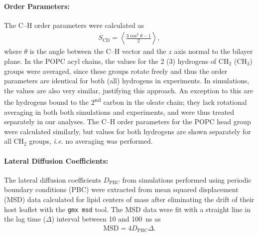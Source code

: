 \documentclass[journal=jctcce]{achemso}
\begin{document}
\paragraph{Order Parameters:} The C--H order parameters were calculated as
%
\begin{align}
    S_\mathrm{CD}=\left\langle\frac{3\cos^2\theta-1}{2}\right\rangle,
\end{align}
%
where $\theta$ is the angle between the C--H vector and the $z$ axis normal to the bilayer plane. In the POPC acyl chains, the values for the 2 (3) hydrogens of CH$_2$ (CH$_3$) groups were averaged, since these groups rotate freely and thus the order parameters are identical for both (all) hydrogens in experiments. In simulations, the values are also very similar, justifying this approach. An exception to this are the hydrogens bound to the 2\textsuperscript{nd} carbon in the oleate chain; they lack rotational averaging in both both simulations and experiments, and were thus treated separately in our analyses. The C--H order parameters for the POPC head group were calculated similarly, but values for both hydrogens are shown separately for all CH$_2$ groups, \textit{i.e.} no averaging was performed. 

\paragraph{Lateral Diffusion Coefficients:} The lateral diffusion coefficients $D_\mathrm{PBC}$ from simulations performed using periodic boundary conditions (PBC) were extracted from mean squared displacement (MSD) data calculated for lipid centers of mass after eliminating the drift of their host leaflet with the \texttt{gmx msd} tool. The MSD data were fit with a straight line in the lag time ($\Delta$) interval between 10 and 100~ns as
%
\begin{align}
	\mathrm{MSD}=4D_\mathrm{PBC}\Delta.
\end{align}
\end{document}
